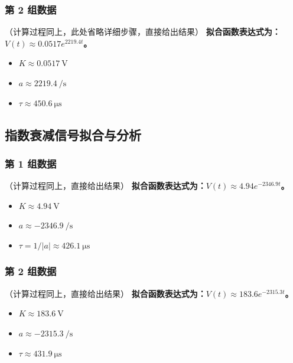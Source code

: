 \documentclass{ctexart}
\begin{document}
\subsubsection{第 2 组数据}
（计算过程同上，此处省略详细步骤，直接给出结果）
\textbf{拟合函数表达式为：$V(t) \approx 0.0517 e^{2219.4 t}$。}
\begin{itemize}
    \item $K \approx \SI{0.0517}{\volt}$
    \item $a \approx \SI{2219.4}{\per\second}$
    \item $\tau \approx \SI{450.6}{\micro\second}$
\end{itemize}

\subsection{指数衰减信号拟合与分析}
\subsubsection{第 1 组数据}
（计算过程同上，直接给出结果）
\textbf{拟合函数表达式为：$V(t) \approx 4.94 e^{-2346.9 t}$。}
\begin{itemize}
    \item $K \approx \SI{4.94}{\volt}$
    \item $a \approx \SI{-2346.9}{\per\second}$
    \item $\tau = 1/|a| \approx \SI{426.1}{\micro\second}$
\end{itemize}

\subsubsection{第 2 组数据}
（计算过程同上，直接给出结果）
\textbf{拟合函数表达式为：$V(t) \approx 183.6 e^{-2315.3 t}$。}
\begin{itemize}
    \item $K \approx \SI{183.6}{\volt}$
    \item $a \approx \SI{-2315.3}{\per\second}$
    \item $\tau \approx \SI{431.9}{\micro\second}$
\end{itemize}
\end{document}
